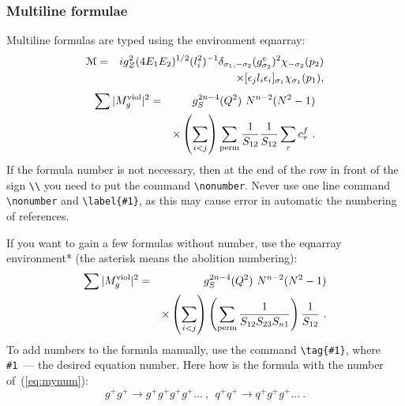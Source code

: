 \documentclass[
11pt,%
tightenlines,%
twoside,%
onecolumn,%
nofloats,%
nobibnotes,%
nofootinbib,%
superscriptaddress,%
noshowpacs,%
centertags]%
{revtex4}
\begin{document}
\subsubsection{Multiline formulae}

Multiline formulas are typed using the environment
eqnarray:
\begin{eqnarray}
{\cal M}=&&ig_Z^2(4E_1E_2)^{1/2}(l_i^2)^{-1}
\delta_{\sigma_1,-\sigma_2}
(g_{\sigma_2}^e)^2\chi_{-\sigma_2}(p_2)\nonumber\\
&&\times
[\epsilon_jl_i\epsilon_i]_{\sigma_1}\chi_{\sigma_1}(p_1),
\end{eqnarray}
\begin{eqnarray}
\sum \vert M^{\rm viol}_g \vert ^2&=&g^{2n-4}_S(Q^2)~N^{n-2}
(N^2-1)\nonumber \\
 & &\times \left( \sum_{i<j}\right)
\sum_{\rm perm}
\frac{1}{S_{12}}
\frac{1}{S_{12}}
\sum_\tau c^f_\tau~.
\end{eqnarray}
If the formula number is not necessary, then at the end of the row in front of the sign
\verb|\\| you need to put the command \verb|\nonumber|. Never
use one line command \verb|\nonumber| and
\verb|\label{#1}|, as this may cause error in automatic
the numbering of references.

If you want to gain a few formulas without number,
use the eqnarray environment* (the asterisk means the abolition
numbering):
\begin{eqnarray*}
\sum \vert M^{\rm viol}_g \vert ^2&=&g^{2n-4}_S(Q^2)~N^{n-2}
(N^2-1)\\
& &\times \left( \sum_{i<j}\right)
\left(
\sum_{\rm perm}\frac{1}{S_{12}S_{23}S_{n1}}
\right)
\frac{1}{S_{12}}~.
\end{eqnarray*}
To add numbers to the formula manually, use the command
\verb+\tag{#1}+, where \verb+#1+~--- the desired equation number.
Here how is the formula with the number of~(\ref{eq:mynum}):
\begin{equation}
g^+g^+ \rightarrow g^+g^+g^+g^+ \dots ~,~~q^+q^+\rightarrow
q^+g^+g^+ \dots ~. \tag{2.6$'$}\label{eq:mynum}
\end{equation}
\end{document}
